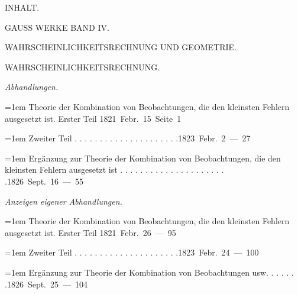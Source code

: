 \clearpage
{}%
\begin{center}\Large INHALT.\par\bigskip GAUSS WERKE BAND IV.\par\medskip\large WAHRSCHEINLICHKEITSRECHNUNG UND GEOMETRIE.\end{center}
\begingroup\fontsize{10.5}{13}\selectfont{}
\par\medskip{}
\begin{center}WAHRSCHEINLICHKEITSRECHNUNG.\end{center}
\par\medskip{}
\noindent\textit{Abhandlungen.}\par
\par\noindent\hangindent=1em Theorie der Kombination von Beobachtungen, die den kleinsten Fehlern ausgesetzt ist. Erster Teil \hfill{}\hbox{}\nobreak\hfill\mbox{1821 Febr. 15 Seite 1}\par
\par\noindent\hangindent=1em Zweiter Teil . . . . . . . . . . . . . . . . . . . . .\hfill{}\hbox{}\nobreak\hfill\mbox{1823 Febr. 2 — 27}\par
\par\noindent\hangindent=1em Ergänzung zur Theorie der Kombination von Beobachtungen, die den kleinsten Fehlern ausgesetzt ist . . . . . . . . . . . . . . . . . . . . . .\hfill{}\hbox{}\nobreak\hfill\mbox{1826 Sept. 16 — 55}\par
\par\medskip{}
\noindent\textit{Anzeigen eigener Abhandlungen.}\par
\par\noindent\hangindent=1em Theorie der Kombination von Beobachtungen, die den kleinsten Fehlern ausgesetzt ist. Erster Teil \hfill{}\hbox{}\nobreak\hfill\mbox{1821 Febr. 26 — 95}\par
\par\noindent\hangindent=1em Zweiter Teil . . . . . . . . . . . . . . . . . . . . .\hfill{}\hbox{}\nobreak\hfill\mbox{1823 Febr. 24 — 100}\par
\par\noindent\hangindent=1em Ergänzung zur Theorie der Kombination von Beobachtungen usw. . . . . . .\hfill{}\hbox{}\nobreak\hfill\mbox{1826 Sept. 25 — 104}\par
\par\medskip{}
